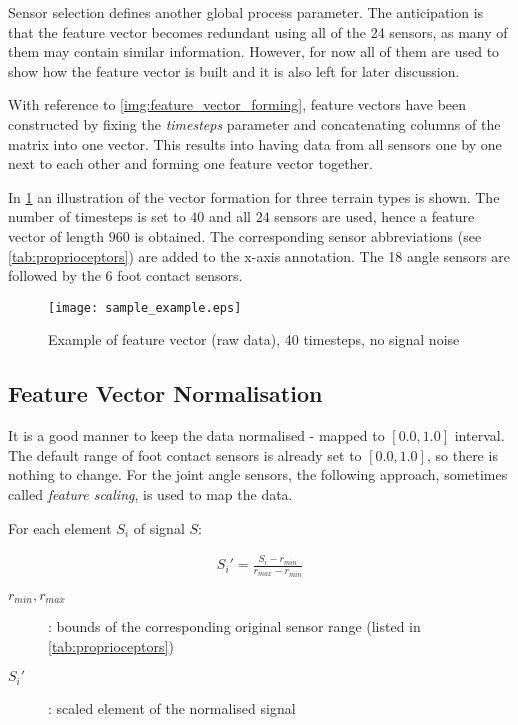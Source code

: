 Sensor selection defines another global process parameter. The anticipation is that the feature vector becomes redundant using all of the 24 sensors, as many of them may contain similar information. However, for now all of them are used to show how the feature vector is built and it is also left for later discussion.

With reference to \cref{img:feature_vector_forming}, feature vectors have been constructed by fixing the \textit{timesteps} parameter and concatenating columns of the matrix into one vector. This results into having data from all sensors one by one next to each other and forming one feature vector together. 

In \cref{fig:sample_example} an illustration of the vector formation for three terrain types is shown. The number of timesteps is set to $ 40 $ and all $ 24 $ sensors are used, hence a feature vector of length $ 960 $ is obtained. The corresponding sensor abbreviations (see \cref{tab:proprioceptors}) are added to the x-axis annotation. The 18 angle sensors are followed by the 6 foot contact sensors.

\begin{figure}[H]
  \centering
  \texttt{[image: sample\_example.eps]}
  \caption{Example of feature vector (raw data), 40 timesteps, no signal noise}
  \label{fig:sample_example}
\end{figure}

\subsection{Feature Vector Normalisation} \label{ssec:normalisation}
It is a good manner to keep the data normalised - mapped to $ [0.0, 1.0] $ interval. The default range of foot contact sensors is already set to $ [0.0, 1.0] $, so there is nothing to change. For the joint angle sensors, the following approach, sometimes called \textit{feature scaling}, is used to map the data.

For each element $ S_i $ of signal $ S $:

\begin{align} \label{eq:normalisation}
S_i' = \frac{S_i - r_{min}}{r_{max} - r_{min}} 
\end{align}

\begin{description}
\item[$ r_{min}, r_{max} $] : bounds of the corresponding original sensor range (listed in \cref{tab:proprioceptors})
\item[$ S_i' $] : scaled element of the normalised signal
\end{description}

